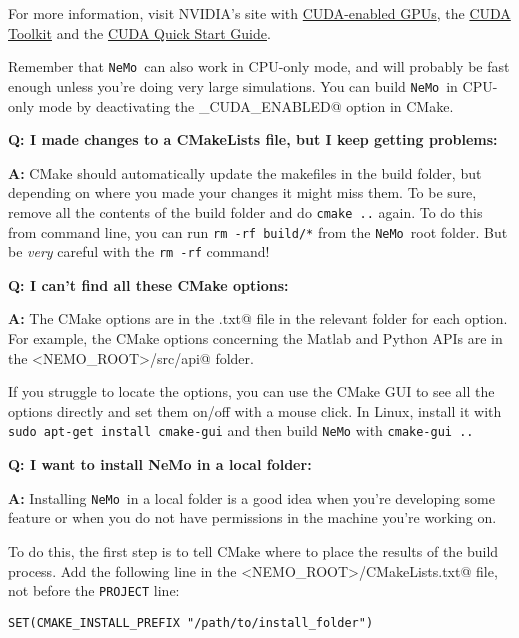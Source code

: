 \documentclass[a4paper]{article}
\newcommand{\nemo}{\texttt{NeMo}\xspace}
\newcommand{\code}[1]{\texttt{#1}}
\newcommand{\command}[1]{\texttt{#1}}
\begin{document}
For more information, visit NVIDIA's site with
\href{https://developer.nvidia.com/cuda-gpus}{CUDA-enabled GPUs}, the
\href{https://developer.nvidia.com/accelerated-computing-toolkit}{CUDA Toolkit}
and the
\href{http://developer.download.nvidia.com/compute/cuda/7.5/Prod/docs/sidebar/CUDA_Quick_Start_Guide.pdf}{CUDA
Quick Start Guide}.

Remember that \nemo\ can also work in CPU-only mode, and will probably be fast
enough unless you're doing very large simulations. You can build \nemo\ in
CPU-only mode by deactivating the \verb@NEMO_CUDA_ENABLED@ option in CMake.

\vspace{5pt}
\textbf{Q: I made changes to a CMakeLists file, but I keep getting problems:}

\textbf{A:} CMake should automatically update the makefiles in the build
folder, but depending on where you made your changes it might miss them. To be
sure, remove all the contents of the build folder and do \command{cmake ..}
again. To do this from command line, you can run \command{rm -rf build/*} from
the \nemo\ root folder. But be \emph{very} careful with the \command{rm -rf}
command!

\vspace{5pt}
\textbf{Q: I can't find all these CMake options:}

\textbf{A:} The CMake options are in the \verb@CMakeLists.txt@ file in the relevant
folder for each option. For example, the CMake options concerning the Matlab and
Python APIs are in the \verb@<NEMO_ROOT>/src/api@ folder. 

If you struggle to locate the options, you can use the CMake GUI to see all the
options directly and set them on/off with a mouse click. In Linux, install it
with \command{sudo apt-get install cmake-gui} and then build \nemo with
\command{cmake-gui ..}

\vspace{5pt}
\textbf{Q: I want to install NeMo in a local folder:}

\textbf{A:} Installing \nemo\ in a local folder is a good idea when you're
developing some feature or when you do not have \verb@sudo@ permissions in the
machine you're working on.

To do this, the first step is to tell CMake where to place the results of the
build process. Add the following line in the \verb@<NEMO_ROOT>/CMakeLists.txt@
file, not before the \code{PROJECT} line:

\begin{verbatim}
SET(CMAKE_INSTALL_PREFIX "/path/to/install_folder")
\end{verbatim}
\end{document}
